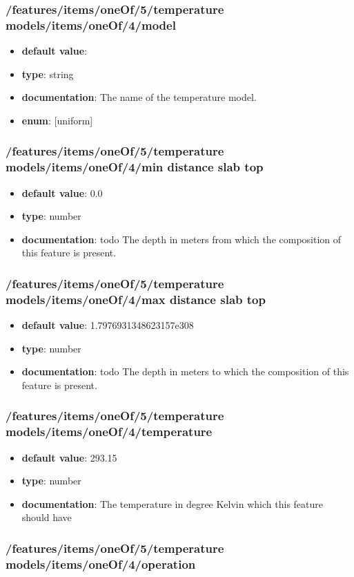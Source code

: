\subsubsection{/features/items/oneOf/5/temperature models/items/oneOf/4/model}
\begin{itemize}\item {\bf default value}: 
\item {\bf type}: string
\item {\bf documentation}: The name of the temperature model.
\item {\bf enum}: [uniform]\end{itemize}\subsubsection{/features/items/oneOf/5/temperature models/items/oneOf/4/min distance slab top}
\begin{itemize}\item {\bf default value}: 0.0
\item {\bf type}: number
\item {\bf documentation}: todo The depth in meters from which the composition of this feature is present.
\end{itemize}\subsubsection{/features/items/oneOf/5/temperature models/items/oneOf/4/max distance slab top}
\begin{itemize}\item {\bf default value}: 1.7976931348623157e308
\item {\bf type}: number
\item {\bf documentation}: todo The depth in meters to which the composition of this feature is present.
\end{itemize}\subsubsection{/features/items/oneOf/5/temperature models/items/oneOf/4/temperature}
\begin{itemize}\item {\bf default value}: 293.15
\item {\bf type}: number
\item {\bf documentation}: The temperature in degree Kelvin which this feature should have
\end{itemize}\subsubsection{/features/items/oneOf/5/temperature models/items/oneOf/4/operation}
